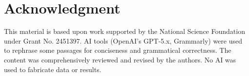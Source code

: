 \documentclass[conference]{IEEEtran}
\begin{document}
\section*{Acknowledgment}
This material is based upon work supported by the National Science Foundation under Grant No. 2451397. AI tools (OpenAI's GPT-5.x, Grammarly) were used to rephrase some passages for conciseness and grammatical correctness. The content was comprehensively reviewed and revised by the authors. No AI was used to fabricate data or results.

\balance

%
%
%
%
%

\end{document}

